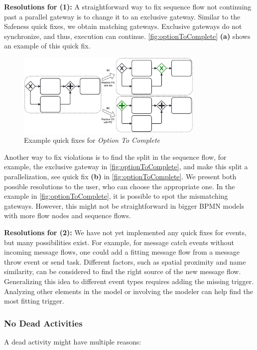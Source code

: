 \documentclass[runningheads]{llncs}
\begin{document}
\textbf{Resolutions for (1):} A straightforward way to fix sequence flow not continuing past a parallel gateway is to change it to an exclusive gateway.
Similar to the Safeness quick fixes, we obtain matching gateways.
Exclusive gateways do not synchronize, and thus, execution can continue.
\autoref{fig:optionToComplete} \textbf{(a)} shows an example of this quick fix.

\begin{figure}[ht]
	\centering
	\includegraphics[width=0.8\textwidth]{images/optionToComplete}
	\caption{Example quick fixes for \textit{Option To Complete}}
	\label{fig:optionToComplete}
\end{figure}

Another way to fix violations is to find the split in the sequence flow, for example, the exclusive gateway in \autoref{fig:optionToComplete}, and make this split a parallelization, see quick fix \textbf{(b)} in \autoref{fig:optionToComplete}.
We present both possible resolutions to the user, who can choose the appropriate one.
In the example in \autoref{fig:optionToComplete}, it is possible to spot the mismatching gateways.
However, this might not be straightforward in bigger BPMN models with more flow nodes and sequence flows.

\textbf{Resolutions for (2):} We have not yet implemented any quick fixes for events, but many possibilities exist.
For example, for message catch events without incoming message flows, one could add a fitting message flow from a message throw event or send task.
Different factors, such as spatial proximity and name similarity, can be considered to find the right source of the new message flow.
Generalizing this idea to different event types requires adding the missing trigger.
Analyzing other elements in the model or involving the modeler can help find the most fitting trigger.

\subsubsection{No Dead Activities}
A dead activity might have multiple reasons:
\end{document}
